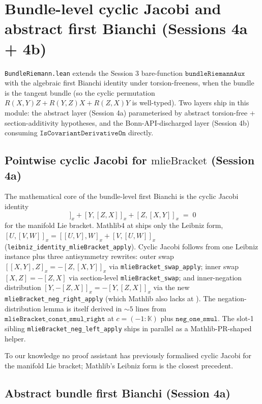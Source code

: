 \documentclass[twocolumn]{revtex4-2}
\begin{document}
\section{Bundle-level cyclic Jacobi and abstract first Bianchi
(Sessions 4a + 4b)}\label{sec:bundle-bianchi}

\texttt{BundleRiemann.lean} extends the Session 3 bare-function
$\mathtt{bundleRiemannAux}$ with the algebraic first Bianchi identity
under torsion-freeness, when the bundle is the tangent bundle (so the
cyclic permutation $R(X, Y) Z + R(Y, Z) X + R(Z, X) Y$ is well-typed).
Two layers ship in this module: the abstract layer (Session 4a)
parameterised by abstract torsion-free + section-additivity hypotheses,
and the Bonn-API-discharged layer (Session 4b) consuming
$\texttt{IsCovariantDerivativeOn}$ directly.

\subsection{Pointwise cyclic Jacobi for $\mathrm{mlieBracket}$ (Session 4a)}

The mathematical core of the bundle-level first Bianchi is the cyclic
Jacobi identity
\begin{equation*}
[X, [Y, Z]]_x + [Y, [Z, X]]_x + [Z, [X, Y]]_x \;=\; 0
\end{equation*}
for the manifold Lie bracket. Mathlib4 at \texttt{\mathlibrev} ships only
the Leibniz form, $[U, [V, W]]_x = [[U, V], W]_x + [V, [U, W]]_x$
(\texttt{leibniz\_identity\_mlieBracket\_apply}). Cyclic Jacobi follows
from one Leibniz instance plus three antisymmetry rewrites: outer
swap $[[X, Y], Z]_x = -[Z, [X, Y]]_x$ via
\texttt{mlieBracket\_swap\_apply}; inner swap $[X, Z] = -[Z, X]$ via
section-level \texttt{mlieBracket\_swap}; and inner-negation
distribution $[Y, -[Z, X]]_x = -[Y, [Z, X]]_x$ via the new
\texttt{mlieBracket\_neg\_right\_apply} (which Mathlib also lacks at
\texttt{\mathlibrev}). The negation-distribution lemma is itself derived
in $\sim 5$ lines from $\texttt{mlieBracket\_const\_smul\_right}$ at
$c = (-1 : \mathbb{K})$ plus $\texttt{neg\_one\_smul}$. The slot-1
sibling \texttt{mlieBracket\_neg\_left\_apply} ships in parallel as a
Mathlib-PR-shaped helper.

To our knowledge no proof assistant has previously formalised cyclic
Jacobi for the manifold Lie bracket; Mathlib's Leibniz form is the
closest precedent.

\subsection{Abstract bundle first Bianchi (Session 4a)}
\end{document}
